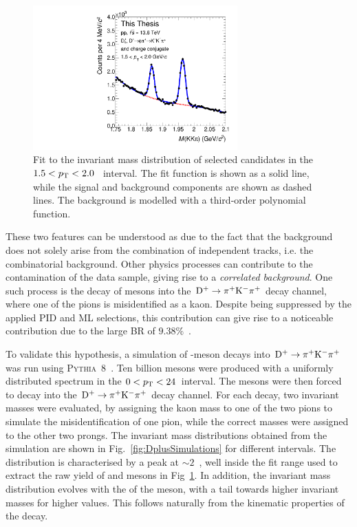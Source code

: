 \begin{figure}[htb]
    \centering
    \includegraphics[width=0.7\textwidth]{Figures/Chapter 5/InvMassFitDs1p5_2.pdf}
    \caption{Fit to the invariant mass distribution of selected candidates in the \mbox{$1.5<p_\mathrm{T}<2.0$~\gevc} interval. The fit function is shown as a solid line, while the signal and background components are shown as dashed lines. The background is modelled with a third-order polynomial function.}
    \label{fig:old_fit}
\end{figure}

These two features can be understood as due to the fact that the background does not solely arise from the combination of independent tracks, i.e. the combinatorial background. Other physics processes can contribute to the contamination of the data sample, giving rise to a \emph{correlated background}. One such process is the decay of \dpl mesons into the $\mathrm{D^+}\rightarrow\mathrm{\pi^+K^-\pi^+}$ decay channel, where one of the pions is misidentified as a kaon. Despite being suppressed by the applied PID and ML selections, this contribution can give rise to a noticeable contribution due to the large BR of $9.38\%$~\cite{pdg}.

To validate this hypothesis, a simulation of \dpl-meson decays into \mbox{$\mathrm{D^+}\rightarrow\mathrm{\pi^+K^-\pi^+}$} was run using \textsc{Pythia}~8~\cite{Bierlich:2022pfr}. Ten billion \dpl mesons were produced with a uniformly distributed \pt spectrum in the $0<p_\mathrm{T}<24$~\gevc interval. The \dpl mesons were then forced to decay into the $\mathrm{D^+}\rightarrow\mathrm{\pi^+K^-\pi^+}$ decay channel. For each decay, two invariant masses were evaluated, by assigning the kaon mass to one of the two pions to simulate the misidentification of one pion, while the correct masses were assigned to the other two prongs. The invariant mass distributions obtained from the simulation are shown in Fig.~\ref{fig:DplusSimulations} for different \pt intervals. The distribution is characterised by a peak at $\sim 2$~\gevcc, well inside the fit range used to extract the raw yield of \ds and \dpl mesons in Fig~\ref{fig:old_fit}. In addition, the invariant mass distribution evolves with the \pt of the \dpl meson, with a tail towards higher invariant masses for higher \pt values. This follows naturally from the kinematic properties of the decay.

